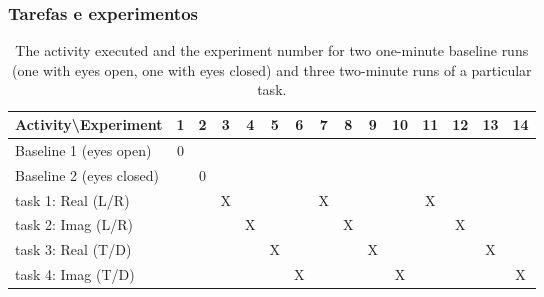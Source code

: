 \documentclass[11pt, aspectratio=169]{beamer}
\begin{document}
\begin{frame}
  \frametitle{Tarefas e experimentos}
\begin{table}[!ht]
	\centering
	\caption{The activity executed and the experiment number for two one-minute baseline runs (one with eyes open, one with eyes closed) and three two-minute runs of a particular task.}
	\tabcolsep=0.12cm
  \label{table_tasks}
	\begin{tabular}{|l|c|c|c|c|c|c|c|c|c|c|c|c|c|c|}
		\hline
		Activity\textbackslash Experiment  & 1 & 2 & \textbf{3} & \textbf{4} & \textbf{5} & \textbf{6} & \textbf{7} & \textbf{8} & \textbf{9} & \textbf{10} & \textbf{11} & \textbf{12} & \textbf{13} & \textbf{14} \\ \hline
		Baseline 1 (eyes open)     & 0 &   &   &   &   &   &   &   &   &    &    &    &    &    \\ \hline
		Baseline 2 (eyes closed)    &   & 0 &   &   &   &   &   &   &   &    &    &    &    &    \\ \hline \hline
		task 1: Real (L/R)        &   &   & X &   &   &   & X &   &   &    & X  &    &    &    \\ \hline
		task 2: Imag (L/R)         &   &   &   & X &   &   &   & X &   &    &    & X &    &    \\ \hline
		task 3: Real (T/D)         &   &   &   &   & X &   &   &   & X &    &    &    & X  &    \\ \hline
		task 4: Imag (T/D)         &   &   &   &   &   & X &   &   &   & X  &    &    &    & X  \\ \hline
	\end{tabular}

\end{table}

\end{frame}
\end{document}
